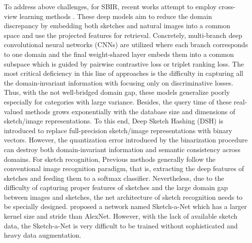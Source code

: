 To address above challenges, for SBIR, recent works attempt to employ cross-view learning methods \cite{SaavedraB10,EitzHBA10,LiuSSLS17,SaavedraB15,hu2010,ParuiM14,dalal2005,hu2010_1,Saavedra14,Lowe99}.
These deep models aim to reduce the domain discrepancy by embedding both sketches and natural images into a common space and use the projected features for retrieval.
Concretely, multi-branch deep convolutional neural networks (CNNs) are utilized where each branch corresponds to one domain and the final weight-shared layer embeds them into a common
subspace which is guided by pairwise contrastive loss or triplet ranking loss.
The most critical deficiency in this line of approaches is the difficulty in capturing all the domain-invariant information with focusing only on discriminative losses.
Thus, with the not well-bridged domain gap, these models generalize poorly especially for categories with large variance. 
Besides, the query time of these real-valued methods grows exponentially with the database size and dimensions of sketch/image representations. To this end, Deep Sketch Hashing 
(DSH) \cite{LiuSSLS17} is introduced to replace full-precision sketch/image representations with binary vectors. However, the quantization error introduced 
by the binarization procedure can destroy both domain-invariant information and semantic consistency across domains. 
For sketch recognition, Previous methods generally follow the conventional image recognition paradigm, that is, extracting the deep features of sketches and feeding them to 
a softmax classifier. Nevertheless, due to the difficulty of capturing proper features of sketches and the large domain gap between images and sketches, the net architecture of sketch recognition needs to be specially designed.
\cite{sketchanet} proposed a network named Sketch-a-Net which has a larger kernel size and stride than AlexNet. However, with the lack of available sketch data, the Sketch-a-Net is 
very difficult to be trained without sophisticated and heavy data augmentation.



